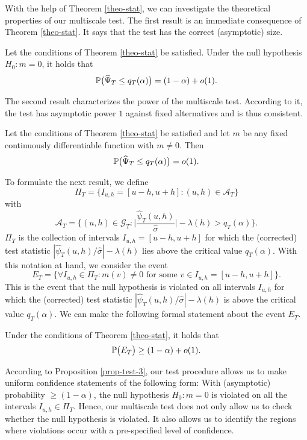 \documentclass[a4paper,12pt]{article}
\numberwithin{equation}{section}
\begin{document}
With the help of Theorem \ref{theo-stat}, we can investigate the theoretical properties of our multiscale test. The first result is an immediate consequence of Theorem \ref{theo-stat}. It says that the test has the correct (asymptotic) size. 
\begin{prop}\label{prop-test-1}
Let the conditions of Theorem \ref{theo-stat} be satisfied. Under the null hypothesis $H_0: m = 0$, it holds that 
\[ \mathbb{P} \big( \widehat{\Psi}_T \le q_T(\alpha) \big) = (1 - \alpha) + o(1). \]
\end{prop}
The second result characterizes the power of the multiscale test. According to it, the test has asymptotic power $1$ against fixed alternatives and is thus consistent. 
\begin{prop}\label{prop-test-2}
Let the conditions of Theorem \ref{theo-stat} be satisfied and let $m$ be any fixed continuously differentiable function with $m \ne 0$. Then 
\[ \mathbb{P} \big( \widehat{\Psi}_T \le q_T(\alpha) \big) = o(1). \]
\end{prop}
To formulate the next result, we define 
\[ \Pi_T = \big\{ I_{u,h} = [u-h,u+h]: (u,h) \in \mathcal{A}_T \big\} \]
with 
\[ \mathcal{A}_T = \Big\{ (u,h) \in \mathcal{G}_T: \Big|\frac{\widehat{\psi}_T(u,h)}{\widehat{\sigma}}\Big| - \lambda(h) > q_T(\alpha) \Big\}. \]
$\Pi_T$ is the collection of intervals $I_{u,h} = [u-h,u+h]$ for which the (corrected) test statistic $|\widehat{\psi}_T(u,h)/\widehat{\sigma}| - \lambda(h)$ lies above the critical value $q_T(\alpha)$. With this notation at hand, we consider the event 
\[ E_T = \Big\{ \forall I_{u,h} \in \Pi_T: m(v) \ne 0 \text{ for some } v \in I_{u,h} = [u-h,u+h] \Big\}. \]
This is the event that the null hypothesis is violated on all intervals $I_{u,h}$ for which the (corrected) test statistic $|\widehat{\psi}_T(u,h)/\widehat{\sigma}| - \lambda(h)$ is above the critical value $q_T(\alpha)$. We can make the following formal statement about the event $E_T$. 
\begin{prop}\label{prop-test-3}
Under the conditions of Theorem \ref{theo-stat}, it holds that  
\[ \mathbb{P} \big( E_T \big) \ge (1-\alpha) + o(1). \] 
\end{prop}
According to Proposition \ref{prop-test-3}, our test procedure allows us to make uniform confidence statements of the following form: With (asymptotic) probability $\ge (1-\alpha)$, the null hypothesis $H_0: m = 0$ is violated on all the intervals $I_{u,h} \in \Pi_T$. Hence, our multiscale test does not only allow us to check whether the null hypothesis is violated. It also allows us to identify the regions where violations occur with a pre-specified level of confidence. 
 
\end{document}

